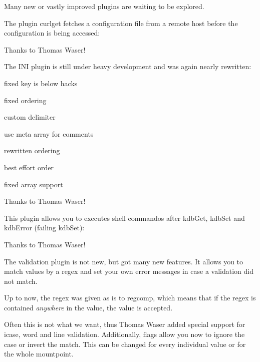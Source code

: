 Many new or vastly improved plugins are waiting to be explored.

The plugin curlget fetches a configuration file from a remote host before the configuration is being accessed\+:


\begin{DoxyCode}{0}
\end{DoxyCode}


Thanks to Thomas Waser!

The I\+NI plugin is still under heavy development and was again nearly rewritten\+:


\begin{DoxyItemize}
\item fixed key is below hacks
\item fixed ordering
\item custom delimiter
\item use meta array for comments
\item rewritten ordering
\item best effort order
\item fixed array support
\end{DoxyItemize}

Thanks to Thomas Waser!

This plugin allows you to executes shell commandos after kdb\+Get, kdb\+Set and kdb\+Error (failing kdb\+Set)\+:


\begin{DoxyCode}{0}
\end{DoxyCode}


Thanks to Thomas Waser!

The validation plugin is not new, but got many new features. It allows you to match values by a regex and set your own error messages in case a validation did not match.

Up to now, the regex was given as is to regcomp, which means that if the regex is contained {\itshape anywhere} in the value, the value is accepted.

Often this is not what we want, thus Thomas Waser added special support for icase, word and line validation. Additionally, flags allow you now to ignore the case or invert the match. This can be changed for every individual value or for the whole mountpoint.

